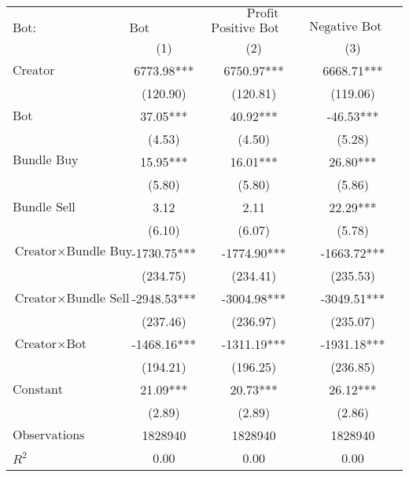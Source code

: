 \begin{tabular}{lccc}
\hline
 & \multicolumn{3}{c}{$\text{Profit}$} \\
 $\text{Bot}:$ & $\text{Bot Comment}$ & $\text{Positive Bot Comment}$ & $\text{Negative Bot Comment}$ \\
 & (1) & (2) & (3)\\
\hline
$\text{Creator}$ & 6773.98*** & 6750.97*** & 6668.71*** \\
 & (120.90) & (120.81) & (119.06) \\
$\text{Bot}$ & 37.05*** & 40.92*** & -46.53*** \\
 & (4.53) & (4.50) & (5.28) \\
$\text{Bundle Buy}$ & 15.95*** & 16.01*** & 26.80*** \\
 & (5.80) & (5.80) & (5.86) \\
$\text{Bundle Sell}$ & 3.12 & 2.11 & 22.29*** \\
 & (6.10) & (6.07) & (5.78) \\
$\text{Creator} \times \text{Bundle Buy}$ & -1730.75*** & -1774.90*** & -1663.72*** \\
 & (234.75) & (234.41) & (235.53) \\
$\text{Creator} \times \text{Bundle Sell}$ & -2948.53*** & -3004.98*** & -3049.51*** \\
 & (237.46) & (236.97) & (235.07) \\
$\text{Creator} \times \text{Bot}$ & -1468.16*** & -1311.19*** & -1931.18*** \\
 & (194.21) & (196.25) & (236.85) \\
$\text{Constant}$ & 21.09*** & 20.73*** & 26.12*** \\
 & (2.89) & (2.89) & (2.86) \\
$\text{Observations}$ & 1828940 & 1828940 & 1828940 \\
$R^2$ & 0.00 & 0.00 & 0.00 \\
\hline
\end{tabular}